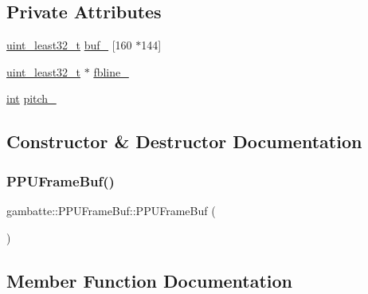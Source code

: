 \subsection*{Private Attributes}
\begin{DoxyCompactItemize}
\item 
\hyperlink{namespacegambatte_a0639f09fccfbbd5a8e0796318768e370}{uint\+\_\+least32\+\_\+t} \hyperlink{classgambatte_1_1PPUFrameBuf_acecd3ac842c0311c0eb1e4dd4e94d4ec}{buf\+\_\+} \mbox{[}160 $\ast$144\mbox{]}
\item 
\hyperlink{namespacegambatte_a0639f09fccfbbd5a8e0796318768e370}{uint\+\_\+least32\+\_\+t} $\ast$ \hyperlink{classgambatte_1_1PPUFrameBuf_ab54824a38a8ad536e537642510352cd4}{fbline\+\_\+}
\item 
\hyperlink{ioapi_8h_a787fa3cf048117ba7123753c1e74fcd6}{int} \hyperlink{classgambatte_1_1PPUFrameBuf_aa0961f70dd373c63c5c4e95fb14b20e5}{pitch\+\_\+}
\end{DoxyCompactItemize}


\subsection{Constructor \& Destructor Documentation}
\mbox{\label{classgambatte_1_1PPUFrameBuf_aac16035ebd11d4d7c94c4cd3a6c64f76}} 
\subsubsection{\texorpdfstring{P\+P\+U\+Frame\+Buf()}{PPUFrameBuf()}}
{\footnotesize\ttfamily gambatte\+::\+P\+P\+U\+Frame\+Buf\+::\+P\+P\+U\+Frame\+Buf (\begin{DoxyParamCaption}{ }\end{DoxyParamCaption})\hspace{0.3cm}{\ttfamily [inline]}}



\subsection{Member Function Documentation}
\mbox{\label{classgambatte_1_1PPUFrameBuf_ae48a732c58c23832d9fa59a53a052d6e}} 
